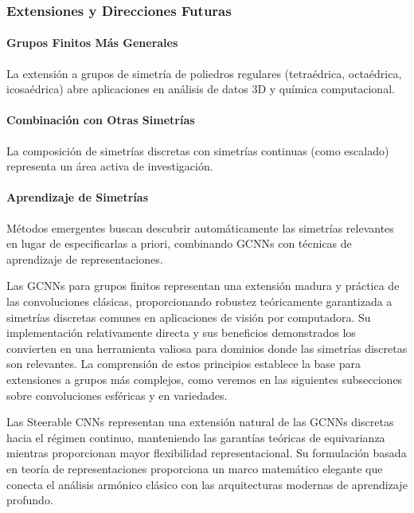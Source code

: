 \subsubsection{Extensiones y Direcciones Futuras}

\paragraph{Grupos Finitos Más Generales}

La extensión a grupos de simetría de poliedros regulares (tetraédrica, octaédrica, icosaédrica) abre aplicaciones en análisis de datos 3D y química computacional.

\paragraph{Combinación con Otras Simetrías}

La composición de simetrías discretas con simetrías continuas (como escalado) representa un área activa de investigación.

\paragraph{Aprendizaje de Simetrías}

Métodos emergentes buscan descubrir automáticamente las simetrías relevantes en lugar de especificarlas a priori, combinando \glspl{GCNN} con técnicas de aprendizaje de representaciones.

Las \glspl{GCNN} para grupos finitos representan una extensión madura y práctica de las convoluciones clásicas, proporcionando robustez teóricamente garantizada a simetrías discretas comunes en aplicaciones de visión por computadora. Su implementación relativamente directa y sus beneficios demonstrados los convierten en una herramienta valiosa para dominios donde las simetrías discretas son relevantes. La comprensión de estos principios establece la base para extensiones a grupos más complejos, como veremos en las siguientes subsecciones sobre convoluciones esféricas y en variedades.


Las Steerable \glspl{CNN} representan una extensión natural de las \glspl{GCNN} discretas hacia el régimen continuo, manteniendo las garantías teóricas de equivarianza mientras proporcionan mayor flexibilidad representacional. Su formulación basada en teoría de representaciones proporciona un marco matemático elegante que conecta el análisis armónico clásico con las arquitecturas modernas de aprendizaje profundo.

